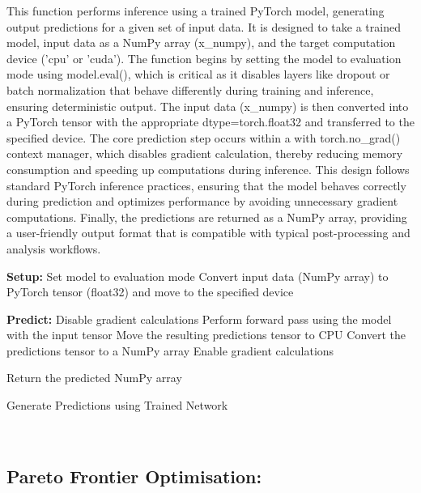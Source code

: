 \documentclass{article}
\begin{document}
This function performs inference using a trained PyTorch model, generating output predictions for a given set of input data. It is designed to take a trained model, input data as a NumPy array (x\_numpy), and the target computation device ('cpu' or 'cuda'). The function begins by setting the model to evaluation mode using model.eval(), which is critical as it disables layers like dropout or batch normalization that behave differently during training and inference, ensuring deterministic output. The input data (x\_numpy) is then converted into a PyTorch tensor with the appropriate dtype=torch.float32 and transferred to the specified device. The core prediction step occurs within a with torch.no\_grad() context manager, which disables gradient calculation, thereby reducing memory consumption and speeding up computations during inference. This design follows standard PyTorch inference practices, ensuring that the model behaves correctly during prediction and optimizes performance by avoiding unnecessary gradient computations. Finally, the predictions are returned as a NumPy array, providing a user-friendly output format that is compatible with typical post-processing and analysis workflows.\\

\begin{algorithm}[H]
\SetAlgoLined %

\textbf{Setup:}\;
Set model to evaluation mode\;
Convert input data (NumPy array) to PyTorch tensor (float32) and move to the specified device\;

\textbf{Predict:}\;
Disable gradient calculations\;
Perform forward pass using the model with the input tensor\;
Move the resulting predictions tensor to CPU\;
Convert the predictions tensor to a NumPy array\;
Enable gradient calculations\; %

Return the predicted NumPy array\;

\caption{Generate Predictions using Trained Network}
\label{alg:predict} %
\end{algorithm}\\






\subsection{Pareto Frontier Optimisation: }
\end{document}
